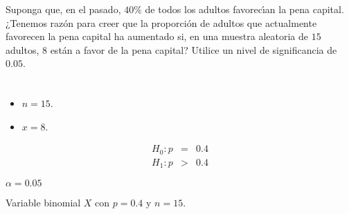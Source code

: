 \begin{enunciado}
 Suponga que, en el pasado, $40\%$ de todos los adultos favorec\'{\i}an
 la pena capital.
 ¿Tenemos raz\'on para creer que la proporci\'on de adultos que actualmente favorecen
 la pena capital ha aumentado
 si, en una muestra aleatoria de $15$ adultos, $8$ est\'an a favor de la pena capital?
 Utilice un nivel de significancia de $0.05$.
\end{enunciado}

\begin{solucion}
 \begin{datos}
  $\phantom{0}$
  \begin{itemize}
   \item $n = 15$.
   \item $x = 8$.
  \end{itemize}
 \end{datos}

 \begin{hipotesis}
  \begin{eqnarray*}
   H_0: p & = & 0.4 \\
   H_1: p & > & 0.4
  \end{eqnarray*}
 \end{hipotesis}

 \begin{significancia}
  $\alpha = 0.05$
 \end{significancia}

 \begin{estadistico}
  Variable binomial $X$ con $p = 0.4$ y $n = 15$.
 \end{estadistico}


\end{solucion}

